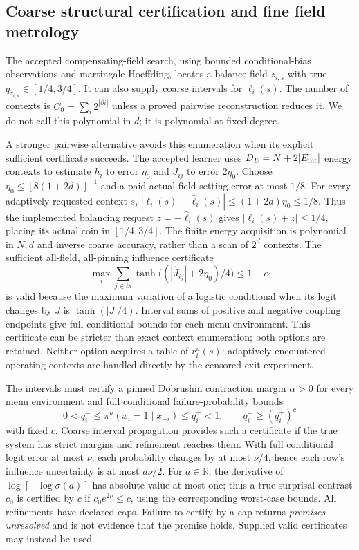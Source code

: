 \documentclass[11pt]{article}
\newcommand{\sig}{\sigma}
\begin{document}
\subsection{Coarse structural certification and fine field metrology}

The accepted compensating-field search, using bounded conditional-bias
observations and martingale Hoeffding, locates a balance field $z_{i,s}$ with
true $q_{z_{i,s}}\in[1/4,3/4]$. It can also supply coarse intervals for
$\ell_i(s)$. The number of contexts is
$C_0=\sum_i2^{|\partial i|}$ unless a proved pairwise reconstruction reduces it.
We do not call this polynomial in $d$; it is polynomial at fixed degree.

A stronger pairwise alternative avoids this enumeration when its explicit
sufficient certificate succeeds. The accepted learner uses
$D_E=N+2|E_{\rm int}|$ energy contexts to estimate $h_i$ to error
$\eta_0$ and $J_{ij}$ to error $2\eta_0$. Choose
$\eta_0\le[8(1+2d)]^{-1}$ and a paid actual field-setting error at most
$1/8$. For every adaptively requested context $s$,
$|\ell_i(s)-\widehat\ell_i(s)|\le(1+2d)\eta_0\le1/8$.
Thus the implemented balancing request $z=-\widehat\ell_i(s)$ gives
$|\ell_i(s)+z|\le1/4$, placing its actual coin in $[1/4,3/4]$.
The finite energy acquisition is polynomial in $N,d$ and inverse coarse
accuracy, rather than a scan of $2^d$ contexts. The sufficient all-field,
all-pinning influence certificate
\[
 \max_i\sum_{j\in\partial i}
       \tanh\bigl((|\widehat J_{ij}|+2\eta_0)/4\bigr)\le1-\alpha
\]
is valid because the maximum variation of a logistic conditional when its
logit changes by $J$ is $\tanh(|J|/4)$. Interval sums of positive and
negative coupling endpoints give full conditional bounds for each menu
environment. This certificate can be stricter than exact context
enumeration; both options are retained. Neither option acquires a table
of $r_i^u(s)$: adaptively encountered operating contexts are handled
directly by the censored-exit experiment.

The intervals must certify a pinned Dobrushin contraction margin $\alpha>0$
for every menu environment and full conditional failure-probability bounds
\begin{equation}\label{eq:contrast}
 0<q_i^-\le\pi^u(x_i=1\mid x_{-i})\le q_i^+<1,\qquad
 q_i^-\ge(q_i^+)^c
\end{equation}
with fixed $c$. Coarse interval propagation provides such a certificate if
the true system has strict margins and refinement reaches them. With full
conditional logit error at most $\nu$, each probability changes by at most
$\nu/4$, hence each row's influence uncertainty is at most $d\nu/2$.
For $a\in\mathbb R$, the derivative of
$\log[-\log\sig(a)]$ has absolute value at most one; thus a true surprisal
contrast $c_0$ is certified by $c$ if $c_0e^{2\nu}\le c$, using the
corresponding worst-case bounds. All refinements have declared caps. Failure
to certify by a cap returns \emph{premises unresolved} and is not evidence
that the premise holds. Supplied valid certificates may instead be used.
\end{document}
